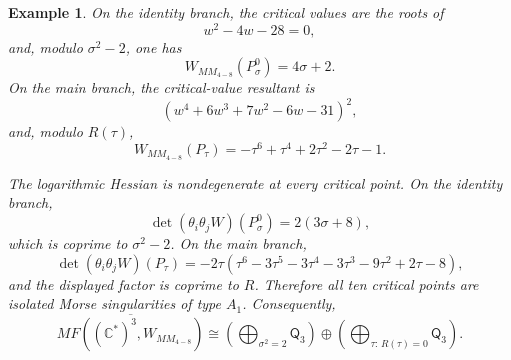 \documentclass[11pt]{amsart}
\newtheorem{example}{Example}[section]
\newcommand{\MorseCat}[1]{\mathsf{Q}_{#1}}
\begin{document}
\begin{example}
On the identity branch, the critical values are the roots of
\[
w^2-4w-28=0,
\]
and, modulo $\sigma^2-2$, one has
\[
W_{MM_{4-8}}(P^0_\sigma)=4\sigma+2.
\]
On the main branch, the critical-value resultant is
\[
\left(w^4+6w^3+7w^2-6w-31\right)^2,
\]
and, modulo $R(\tau)$,
\[
W_{MM_{4-8}}(P_\tau)
=-\tau^6+\tau^4+2\tau^2-2\tau-1.
\]

The logarithmic Hessian is nondegenerate at every critical point. On the
identity branch,
\[
\det(\theta_i\theta_jW)(P^0_\sigma)=2(3\sigma+8),
\]
which is coprime to $\sigma^2-2$. On the main branch,
\[
\det(\theta_i\theta_jW)(P_\tau)
=-2\tau(\tau^6-3\tau^5-3\tau^4-3\tau^3-9\tau^2+2\tau-8),
\]
and the displayed factor is coprime to $R$. Therefore all ten critical points
are isolated Morse singularities of type $A_1$. Consequently,
\[
\overline{MF((\mathbb{C}^*)^3,W_{MM_{4-8}})}
\cong \left(\bigoplus_{\sigma^2=2}\MorseCat{3}\right) \oplus \left(\bigoplus_{\tau:\,R(\tau)=0}\MorseCat{3}\right).
\]
\end{example}
\end{document}
